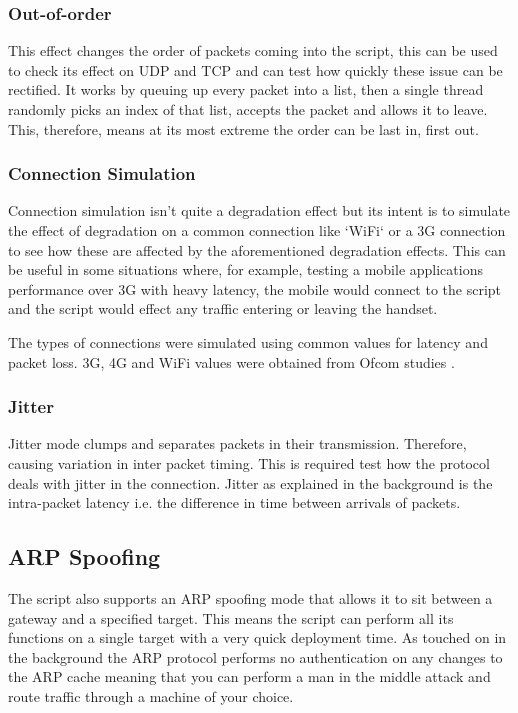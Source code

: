 \subsubsection{Out-of-order}
This effect changes the order of packets coming into the script, this can be used to check its effect on UDP and TCP and can test how quickly these issue can be rectified. It works by queuing up every packet into a list, then a single thread randomly picks an index of that list, accepts the packet and allows it to leave. This, therefore, means at its most extreme the order can be last in, first out.

\subsubsection{Connection Simulation}
Connection simulation isn't quite a degradation effect but its intent is to simulate the effect of degradation on a common connection like `WiFi` or a 3G connection to see how these are affected by the aforementioned degradation effects. This can be useful in some situations where, for example, testing a mobile applications performance over 3G with heavy latency, the mobile would connect to the script and the script would effect any traffic entering or leaving the handset.

The types of connections were simulated using common values for latency and packet loss. 3G, 4G and WiFi values were obtained from Ofcom studies \citep{ofcom} \citep{ofcomMobile}.


\subsubsection{Jitter}
Jitter mode clumps and separates packets in their transmission. Therefore, causing variation in inter packet timing. This is required test how the protocol deals with jitter in the connection. Jitter as explained in the background is the intra-packet latency i.e. the difference in time between arrivals of packets.

\subsection{ARP Spoofing}
\label{ref:arpSpoof}
The script also supports an ARP spoofing mode that allows it to sit between a gateway and a specified target. This means the script can perform all its functions on a single target with a very quick deployment time. As touched on in the background the ARP protocol performs no authentication on any changes to the ARP cache meaning that you can perform a man in the middle attack and route traffic through a machine of your choice.

